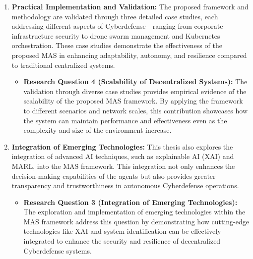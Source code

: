\begin{enumerate}
    \item \textbf{Practical Implementation and Validation:} The proposed framework and methodology are validated through three detailed case studies, each addressing different aspects of Cyberdefense—ranging from corporate infrastructure security to drone swarm management and Kubernetes orchestration. These case studies demonstrate the effectiveness of the proposed MAS in enhancing adaptability, autonomy, and resilience compared to traditional centralized systems.

          \begin{itemize}
              \item \textbf{Research Question 4 (Scalability of Decentralized Systems):} The validation through diverse case studies provides empirical evidence of the scalability of the proposed MAS framework. By applying the framework to different scenarios and network scales, this contribution showcases how the system can maintain performance and effectiveness even as the complexity and size of the environment increase.
          \end{itemize}

    \item \textbf{Integration of Emerging Technologies:} This thesis also explores the integration of advanced AI techniques, such as explainable AI (XAI) and MARL, into the MAS framework. This integration not only enhances the decision-making capabilities of the agents but also provides greater transparency and trustworthiness in autonomous Cyberdefense operations.

          \begin{itemize}
              \item \textbf{Research Question 3 (Integration of Emerging Technologies):} The exploration and implementation of emerging technologies within the MAS framework address this question by demonstrating how cutting-edge technologies like XAI and system identification can be effectively integrated to enhance the security and resilience of decentralized Cyberdefense systems.
          \end{itemize}

\end{enumerate}



